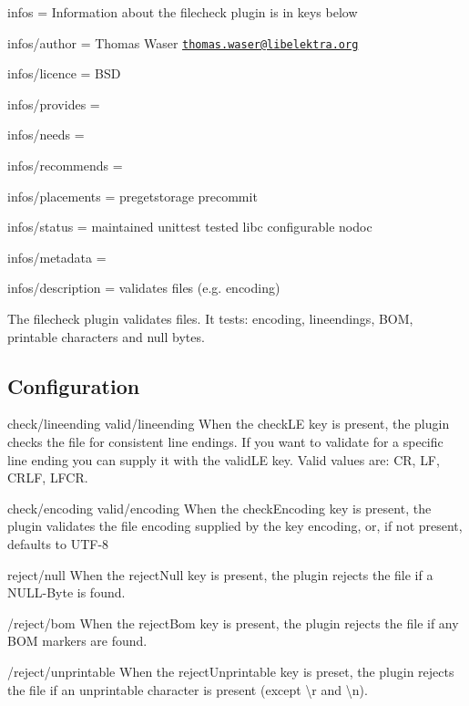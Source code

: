 
\begin{DoxyItemize}
\item infos = Information about the filecheck plugin is in keys below
\item infos/author = Thomas Waser \href{mailto:thomas.waser@libelektra.org}{\tt thomas.\+waser@libelektra.\+org}
\item infos/licence = B\+S\+D
\item infos/provides =
\item infos/needs =
\item infos/recommends =
\item infos/placements = pregetstorage precommit
\item infos/status = maintained unittest tested libc configurable nodoc
\item infos/metadata =
\item infos/description = validates files (e.\+g. encoding)
\end{DoxyItemize}

The filecheck plugin validates files. It tests\+: encoding, lineendings, B\+O\+M, printable characters and null bytes.

\subsection*{Configuration}

{\ttfamily check/lineending} {\ttfamily valid/lineending} When the {\ttfamily check\+L\+E} key is present, the plugin checks the file for consistent line endings. If you want to validate for a specific line ending you can supply it with the {\ttfamily valid\+L\+E} key. Valid values are\+: {\ttfamily C\+R}, {\ttfamily L\+F}, {\ttfamily C\+R\+L\+F}, {\ttfamily L\+F\+C\+R}.

{\ttfamily check/encoding} {\ttfamily valid/encoding} When the {\ttfamily check\+Encoding} key is present, the plugin validates the file encoding supplied by the key {\ttfamily encoding}, or, if not present, defaults to {\ttfamily U\+T\+F-\/8}

{\ttfamily reject/null} When the {\ttfamily reject\+Null} key is present, the plugin rejects the file if a N\+U\+L\+L-\/\+Byte is found.

{\ttfamily /reject/bom} When the {\ttfamily reject\+Bom} key is present, the plugin rejects the file if any B\+O\+M markers are found.

{\ttfamily /reject/unprintable} When the {\ttfamily reject\+Unprintable} key is preset, the plugin rejects the file if an unprintable character is present (except {\ttfamily \textbackslash{}r} and {\ttfamily \textbackslash{}n}). 